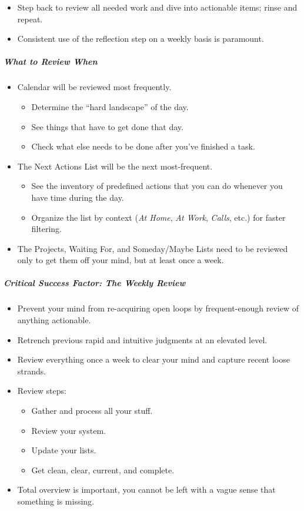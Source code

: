 \documentclass{article}
\begin{document}
\begin{itemize}
  \item Step back to review all needed work and dive into actionable items; rinse and repeat.
  \item Consistent use of the reflection step on a weekly basis is paramount.
\end{itemize}

\subparagraph{What to Review When}

\begin{itemize}
  \item Calendar will be reviewed most frequently.
  \begin{itemize}
    \item Determine the ``hard landscape'' of the day.
    \item See things that have to get done that day.
    \item Check what else needs to be done after you've finished a task.
  \end{itemize}
  \item The Next Actions List will be the next most-frequent.
  \begin{itemize}
    \item See the inventory of predefined actions that you can do whenever you have time during the day.
    \item Organize the list by context (\textit{At Home}, \textit{At Work}, \textit{Calls}, etc.) for faster filtering.
  \end{itemize}
  \item The Projects, Waiting For, and Someday/Maybe Lists need to be reviewed only to get them off your mind, but at least once a week.
\end{itemize}

\subparagraph{Critical Success Factor: The Weekly Review}

\begin{itemize}
  \item Prevent your mind from re-acquiring open loops by frequent-enough review of anything actionable.
  \item Retrench previous rapid and intuitive judgments at an elevated level.
  \item Review everything once a week to clear your mind and capture recent loose strands.
  \item Review steps:
  \begin{itemize}
    \item Gather and process all your stuff.
    \item Review your system.
    \item Update your lists.
    \item Get clean, clear, current, and complete.
  \end{itemize}
  \item Total overview is important, you cannot be left with a vague sense that something is missing.
\end{itemize}
\end{document}
